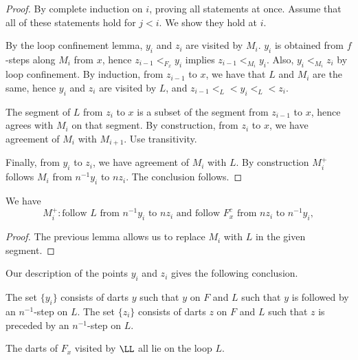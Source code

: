 \begin{lemma}
\begin{lemma}
\begin{proof} By complete induction on $i$, proving all statements
at once.  
Assume that all of these statements hold for $j<i$. We show they
hold at $i$.


By the loop confinement lemma, $y_i$ and $z_i$ are visited by $M_i$.
$y_i$ is obtained from $f$-steps along $M_i$ from $x$, hence
$z_{i-1} <_{F_x} y_i$ implies $z_{i-1} <_{M_i} y_i$.  Also, $y_i <_{M_i} z_i$
by loop confinement.  By induction, from $z_{i-1}$ to $x$, we have that
$L$ and $M_i$ are the same, hence $y_i$ and $z_i$ are visited by $L$, and $z_{i-1} <_L < y_i <_L < z_i$.

The segment of $L$ from $z_i$ to $x$ is a subset of the segment
from $z_{i-1}$ to $x$, hence agrees with $M_i$ on that segment.
By construction, from $z_{i}$ to $x$, we have agreement of $M_i$ with
$M_{i+1}$.  Use transitivity.

Finally, from $y_i$ to $z_i$, we have agreement of $M_i$ with $L$.
By construction $M_i^+$ follows $M_i$ from $n^{-1}y_i$ to $n z_i$.
The conclusion follows.
\end{proof}

\begin{lemma} 
We have
\[
M_i^+: \text{follow } L \text{ from } n^{-1} y_i \text{ to } n z_i
  \text{ and follow } F^c_x \text{ from } nz_i \text{ to } n^{-1} y_i,
\]
\end{lemma} 

\begin{proof} The previous lemma allows us to replace $M_i$
with $L$ in the given  segment.
\end{proof}

Our description of the points $y_i$ and $z_i$ gives the following
conclusion.

\begin{lemma} 
The set $\{y_i\}$ consists of darts $y$ such that
$y$ on $F$ and $L$ such that $y$ is followed by an 
$n^{-1}$-step on $L$.
The set $\{z_i\}$ consists of darts $z$ on $F$ and $L$ such that
$z$ is preceded by an $n^{-1}$-step on $L$.
\end{lemma} 

\begin{lemma}
The darts of $F_x$ visited by $\LL$ all lie on the loop $L$.
\end{lemma}


\end{lemma}
\end{lemma}

